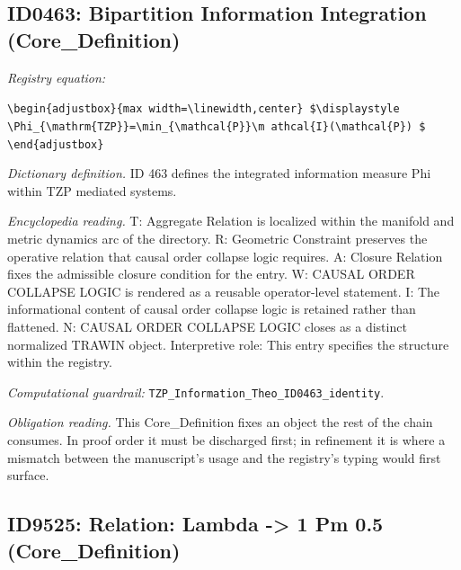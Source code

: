 \documentclass[11pt]{article}
\theoremstyle{remark}
\begin{document}
\subsection{ID0463: Bipartition Information Integration (Core\_Definition)}

\noindent\textit{Registry equation:}\par
{\small\texttt{\textbackslash{}begin\{adjustbox\}\{max width=\textbackslash{}linewidth,center\} \$\textbackslash{}displaystyle \textbackslash{}Phi\_\{\textbackslash{}mathrm\{TZP\}\}=\textbackslash{}min\_\{\textbackslash{}mathcal\{P\}\}\textbackslash{}m athcal\{I\}(\textbackslash{}mathcal\{P\}) \$ \textbackslash{}end\{adjustbox\}}}\par\medskip
\noindent\textit{Dictionary definition.} ID 463 defines the integrated information measure Phi within TZP mediated systems.\par\medskip
\noindent\textit{Encyclopedia reading.} T: Aggregate Relation is localized within the manifold and metric dynamics arc of the directory. R: Geometric Constraint preserves the operative relation that causal order collapse logic requires. A: Closure Relation fixes the admissible closure condition for the entry. W: CAUSAL ORDER COLLAPSE LOGIC is rendered as a reusable operator-level statement. I: The informational content of causal order collapse logic is retained rather than flattened. N: CAUSAL ORDER COLLAPSE LOGIC closes as a distinct normalized TRAWIN object. Interpretive role: This entry specifies the structure within the registry.
\par\medskip\noindent\textit{Computational guardrail:} \texttt{TZP\_Information\_Theo\_ID0463\_identity}.
\par\medskip\noindent\textit{Obligation reading.} This Core\_Definition fixes an object the rest of the chain consumes. In proof order it must be discharged first; in refinement it is where a mismatch between the manuscript's usage and the registry's typing would first surface.

\subsection{ID9525: Relation: Lambda -> 1 Pm 0.5 (Core\_Definition)}
\end{document}
